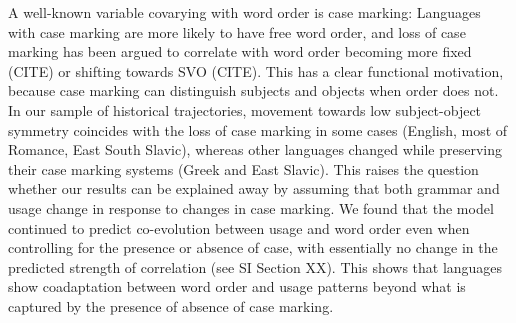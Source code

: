 \documentclass[11pt,a4paper]{article}
\begin{document}
A well-known variable covarying with word order is case marking: Languages with case marking are more likely to have free word order, and loss of case marking has been argued to correlate with word order becoming more fixed (CITE) or shifting towards SVO (CITE).
This has a clear functional motivation, because case marking can distinguish subjects and objects when order does not.
In our sample of historical trajectories, movement towards low subject-object symmetry coincides with the loss of case marking in some cases (English, most of Romance, East South Slavic), whereas other languages changed while preserving their case marking systems (Greek and East Slavic).
This raises the question whether our results can be explained away by assuming that both grammar and usage change in response to changes in case marking.
We found that the model continued to predict co-evolution between usage and word order even when controlling for the presence or absence of case, with essentially no change in the predicted strength of correlation (see SI Section XX).
This shows that languages show coadaptation between word order and usage patterns beyond what is captured by the presence of absence of case marking.

\end{document}
